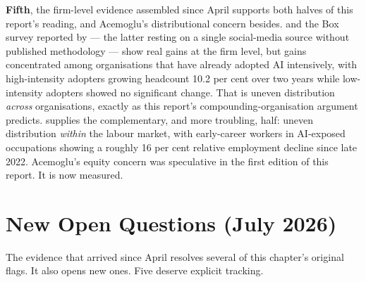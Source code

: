 \textbf{Fifth}, the firm-level evidence assembled since April supports both halves of this report's reading, and Acemoglu's distributional concern besides. \textcite{RampRevelio2026} and the Box survey reported by \textcite{Levie2026} --- the latter resting on a single social-media source without published methodology --- show real gains at the firm level, but gains concentrated among organisations that have already adopted AI intensively, with high-intensity adopters growing headcount 10.2 per cent over two years while low-intensity adopters showed no significant change. That is uneven distribution \emph{across} organisations, exactly as this report's compounding-organisation argument predicts. \parencite{Brynjolfsson2025Canaries} supplies the complementary, and more troubling, half: uneven distribution \emph{within} the labour market, with early-career workers in AI-exposed occupations showing a roughly 16 per cent relative employment decline since late 2022. Acemoglu's equity concern was speculative in the first edition of this report. It is now measured.

\section{New Open Questions (July 2026)}

The evidence that arrived since April resolves several of this chapter's original flags. It also opens new ones. Five deserve explicit tracking.


